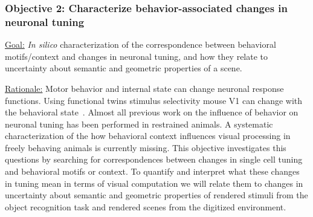 \documentclass[COG,11pt]{ercgrant}
\begin{document}

\subsubsection{Objective 2:  Characterize behavior-associated changes in neuronal tuning \hfill{}}
\underline{Goal:} \textit{In silico} characterization of the correspondence between behavioral motifs/context and changes in neuronal tuning, and how they relate to uncertainty about semantic and geometric properties of a scene. 

\underline{Rationale:} 
Motor behavior and internal state can change neuronal response functions\parencite{Chiappe2010-bm, Bezdudnaya2006-ge, Andermann2011-vw, Treue1996-lp}. 
Using functional twins stimulus selectivity mouse V1 can change with the behavioral state~\parencite{Franke2022-do}.
Almost all previous work on the influence of behavior on neuronal tuning has been performed in restrained animals. 
A systematic characterization of the how behavioral context influences visual processing in freely behaving animals is currently missing. 
This objective investigates this questions by searching for correspondences between changes in single cell tuning and behavioral motifs or context.
To quantify and interpret what these changes in tuning mean in terms of visual computation we will relate them to changes in uncertainty about semantic and geometric properties of rendered stimuli from the object recognition task and rendered scenes from the digitized environment.
\end{document}
